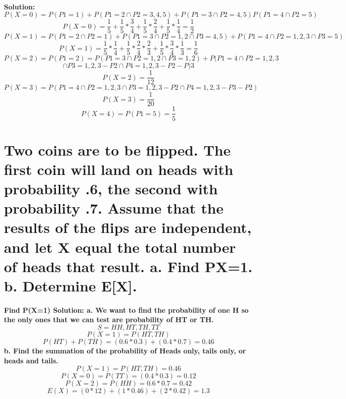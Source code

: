 \documentclass{article}
\begin{document}
\paragraph{
Solution:\newline 
$$P(X = 0) = P(P1=1) + P(P1=2 \cap P2=3,4,5) + P(P1 = 3 \cap P2 = 4,5) P(P1 = 4 \cap P2 = 5)$$\newline $$P(X=0) = \frac{1}{5} + \frac{1}{5}*\frac{3}{4} + \frac{1}{5}*\frac{2}{4} + \frac{1}{5}*\frac{1}{4} = \frac{1}{2}$$\newline
$$P(X = 1) = P(P1 = 2 \cap P2 = 1) + P(P1 = 3 \cap P2 = 1, 2 \cap P3 = 4, 5) + P(P1 = 4 \cap P2 = 1, 2, 3 \cap P3 = 5)$$\newline
$$P(X = 1) = \frac{1}{5} * \frac{1}{4} + \frac{1}{5} * \frac{2}{4} * \frac{2}{3} + \frac{1}{5} * \frac{3}{4} * \frac{1}{3} = \frac{1}{6}$$
$$P(X = 2) = P(P1 = 2) = P(P1 = 3 \cap P2 = 1, 2 \cap P3 = 1, 2) + P(P1 = 4 \cap P2 = 1, 2, 3$$\newline
$$\cap P3 = 1, 2, 3 - P2 \cap P4 = 1, 2, 3 - P2 - P)3$$
$$P(X=2)=\frac{1}{12}$$
$$P(X=3)=P(P1 = 4 \cap P2 = 1, 2, 3 \cap P3 = 1, 2, 3 - P2 \cap P4 = 1, 2, 3 - P3 - P2)$$\newline
$$P(X = 3) = \frac{1}{20}$$
$$P(X = 4) = P(P1 = 5) = \frac{1}{5}$$\newpage
}
\setcounter{section}{24}
\section{Two coins are to be flipped. The first coin will land on heads with probability .6, the second with probability .7. Assume that the results of the flips are independent, and let X equal the total number of heads that result.\newline
a. Find P{X=1}.\newline
b. Determine E[X].}
\paragraph{Find P(X=1)\newline
Solution:\newline
a. We want to find the probability of one H so the only ones that we can test are probability of HT or TH.
$$S = {HH, HT, TH, TT}$$
$$P(X=1) = P(HT, TH)$$
$$P(HT) + P(TH) = (0.6 * 0.3) + (0.4 * 0.7) = 0.46$$
b. Find the summation of the probability of Heads only, tails only, or heads and tails.
$$P(X = 1) = P(HT, TH) = 0.46$$
$$P(X = 0) = P(TT) = (0.4 * 0.3) = 0.12$$
$$P(X = 2) = P(HH) = 0.6 * 0.7 = 0.42$$
$$E(X) = (0*12) + (1*0.46) + (2*0.42) = 1.3$$
}\newpage
\setcounter{section}{34}
\end{document}

